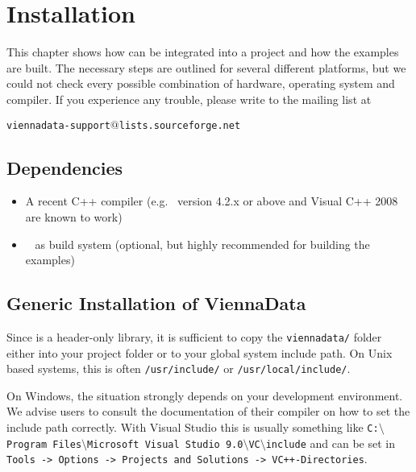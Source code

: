 \chapter{Installation}

This chapter shows how {\ViennaData} can be integrated into a project and how
the examples are built. The necessary steps are outlined for several different
platforms, but we could not check every possible combination of hardware,
operating system and compiler. If you experience any trouble, please write to
the mailing list at \\
\begin{center}
\texttt{viennadata-support$@$lists.sourceforge.net} 
\end{center}


\section{Dependencies}
\label{dependencies}

\begin{itemize}
 \item A recent C++ compiler (e.g.~{\GCC} version 4.2.x or above and Visual C++
2008 are known to work)
 \item {\CMake}~\cite{cmake} as build system (optional, but highly recommended
for building the examples)
\end{itemize}


\section{Generic Installation of ViennaData} \label{sec:viennacl-installation}
Since {\ViennaData} is a header-only library, it is sufficient to copy the 
\lstinline|viennadata/| folder either into your project folder or to your global system
include path. On Unix based systems, this is often \lstinline|/usr/include/| or
\lstinline|/usr/local/include/|.

On Windows, the situation strongly depends on your development environment. We
advise users
to consult the documentation of their compiler on how to set the include
path correctly. With Visual Studio this is usually something like
\texttt{C:$\setminus$Program Files$\setminus$Microsoft Visual Studio
9.0$\setminus$VC$\setminus$include}
and can be set in \texttt{Tools -> Options -> Projects and Solutions ->
VC++-\-Directories}. 


